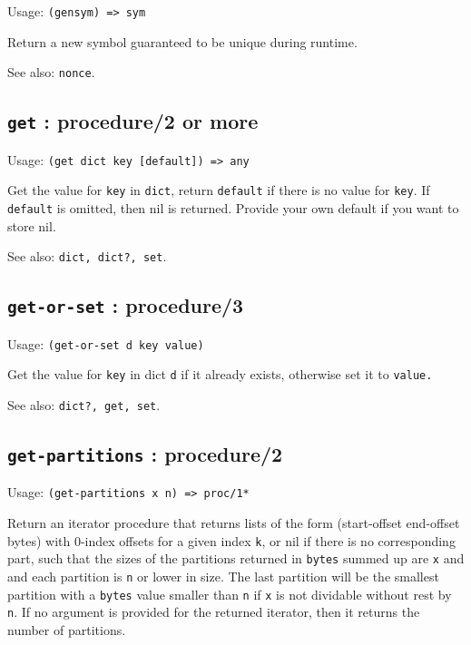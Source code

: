 \documentclass[
]{article}
\newcommand{\passthrough}[1]{#1}
\begin{document}
Usage: \passthrough{\lstinline!(gensym) => sym!}

Return a new symbol guaranteed to be unique during runtime.

See also: \passthrough{\lstinline!nonce!}.

\hypertarget{get-procedure2-or-more-1}{%
\subsection{\texorpdfstring{\texttt{get} : procedure/2 or
more}{get : procedure/2 or more}}\label{get-procedure2-or-more-1}}

Usage: \passthrough{\lstinline!(get dict key [default]) => any!}

Get the value for \passthrough{\lstinline!key!} in
\passthrough{\lstinline!dict!}, return \passthrough{\lstinline!default!}
if there is no value for \passthrough{\lstinline!key!}. If
\passthrough{\lstinline!default!} is omitted, then nil is returned.
Provide your own default if you want to store nil.

See also: \passthrough{\lstinline!dict, dict?, set!}.

\hypertarget{get-or-set-procedure3-1}{%
\subsection{\texorpdfstring{\texttt{get-or-set} :
procedure/3}{get-or-set : procedure/3}}\label{get-or-set-procedure3-1}}

Usage: \passthrough{\lstinline!(get-or-set d key value)!}

Get the value for \passthrough{\lstinline!key!} in dict
\passthrough{\lstinline!d!} if it already exists, otherwise set it to
\passthrough{\lstinline!value.!}

See also: \passthrough{\lstinline!dict?, get, set!}.

\hypertarget{get-partitions-procedure2-1}{%
\subsection{\texorpdfstring{\texttt{get-partitions} :
procedure/2}{get-partitions : procedure/2}}\label{get-partitions-procedure2-1}}

Usage: \passthrough{\lstinline!(get-partitions x n) => proc/1*!}

Return an iterator procedure that returns lists of the form
(start-offset end-offset bytes) with 0-index offsets for a given index
\passthrough{\lstinline!k!}, or nil if there is no corresponding part,
such that the sizes of the partitions returned in
\passthrough{\lstinline!bytes!} summed up are
\passthrough{\lstinline!x!} and and each partition is
\passthrough{\lstinline!n!} or lower in size. The last partition will be
the smallest partition with a \passthrough{\lstinline!bytes!} value
smaller than \passthrough{\lstinline!n!} if \passthrough{\lstinline!x!}
is not dividable without rest by \passthrough{\lstinline!n!}. If no
argument is provided for the returned iterator, then it returns the
number of partitions.
\end{document}
